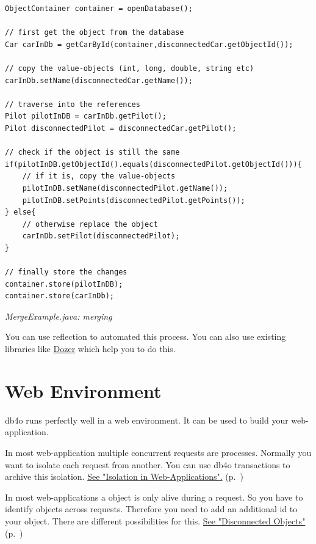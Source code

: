 \begin{lstlisting}
ObjectContainer container = openDatabase();

// first get the object from the database
Car carInDb = getCarById(container,disconnectedCar.getObjectId());

// copy the value-objects (int, long, double, string etc)
carInDb.setName(disconnectedCar.getName());

// traverse into the references
Pilot pilotInDB = carInDb.getPilot();
Pilot disconnectedPilot = disconnectedCar.getPilot();

// check if the object is still the same
if(pilotInDB.getObjectId().equals(disconnectedPilot.getObjectId())){
    // if it is, copy the value-objects
    pilotInDB.setName(disconnectedPilot.getName());
    pilotInDB.setPoints(disconnectedPilot.getPoints());
} else{
    // otherwise replace the object
    carInDb.setPilot(disconnectedPilot); 
}

// finally store the changes
container.store(pilotInDB);
container.store(carInDb);
\end{lstlisting}

{\small\itshape MergeExample.java: merging\par}
\medskip

You can use reflection to automated this process. You can also use existing libraries like  \href{http://dozer.sourceforge.net/}{Dozer} which help you to do this.

\section{Web Environment}
\label{ref:platform-specific-issues-web-environment}

db4o runs perfectly well in a web environment. It can be used to build your web-application.

In most web-application multiple concurrent requests are processes. Normally you want to isolate each request from another. You can use db4o transactions to archive this isolation. \hyperref[ref:platform-specific-issues-web-web-isolation]{See "Isolation in Web-Applications".} (p.~\pageref{ref:platform-specific-issues-web-web-isolation})

In most web-applications a object is only alive during a request. So you have to identify objects across requests. Therefore you need to add an additional id to your object. There are different possibilities for this. \hyperref[ref:platform-specific-issues-disconnected-objects]{See "Disconnected Objects"} (p.~\pageref{ref:platform-specific-issues-disconnected-objects})

